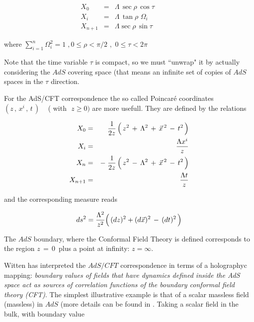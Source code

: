 \documentclass[a4paper,twocolumn,prd,groupedaddress,nofootinbib]{revtex4}
\begin{document}
\begin{eqnarray}
X_0 &=& \Lambda \,\sec\rho\, \cos \tau \nonumber\\
X_i &=& \Lambda \,\tan \rho\, \,\Omega_i\;\qquad\qquad
 \nonumber\\
X_{n+1} &=& \Lambda \sec \rho \,\sin\tau \nonumber
\end{eqnarray}

\noindent where $\sum_{i=1}^n\Omega^2_i=1\;,
0\le \rho <\pi/2\,\, ,\,\,0\le\tau< 2\pi$
 
\bigskip
\noindent Note that the time variable $\tau $ is compact, so we 
must ``unwrap" it by actually considering 
the  $AdS$ covering space (that means an infinite set of copies of $AdS$ spaces in the
$\tau$ direction.


For the   AdS/CFT correspondence the so called  Poincar\'e coordinates 
$(z\,,\,x^i\,,\,t\,)\,\,\,\,\,
$ ( with \,\,$z \ge 0 )$ are more usefull.
They are defined by the relations  

\bigskip

\begin{eqnarray}
X_0 &=& \quad {1\over 2z}\,\Big( \,z^2\,+\,\Lambda^2\,
+\,{\vec x}^{\,2}\,-\,t^2\,\Big)
\nonumber\\
X_i &=& \quad {\Lambda x^i \over z}
\nonumber\\
X_n &=& - \; {1\over 2z}\,
\Big( \,z^2\,-\,\Lambda^2\,+\,{\vec x}^{\,2}\,-\,t^2\,\Big)
\nonumber\\
X_{n+1} &=& \quad\; {\Lambda t \over z}
\nonumber
\end{eqnarray}

\noindent and the corresponding measure reads

$$
ds^2= { \Lambda^2 \over z^2 } \Big(\, (dz)^2 + (d\vec x)^2\,-\, (dt)^2 \,\Big)
$$

\bigskip

\noindent The $AdS$ boundary, where the Conformal Field Theory is defined
corresponds to the region $ z \,=\,0\,$ plus a point at infinity:  $ z   = \infty $.  

\bigskip

\noindent Witten\cite{Wi} has interpreted the $AdS/CFT$ correspondence in terms of a 
holographyc mapping:  {\it boundary values of fields that have dynamics defined  
inside the AdS space act as sources of correlation functions   
of the boundary conformal field theory (CFT)}. 
The simplest illustrative example is that of a scalar massless field (massless) 
in $AdS$ (more details can be found in \cite{GKP,Wi,FMMR,MV}. Taking a scalar field
in the bulk, with boundary value
\end{document}
